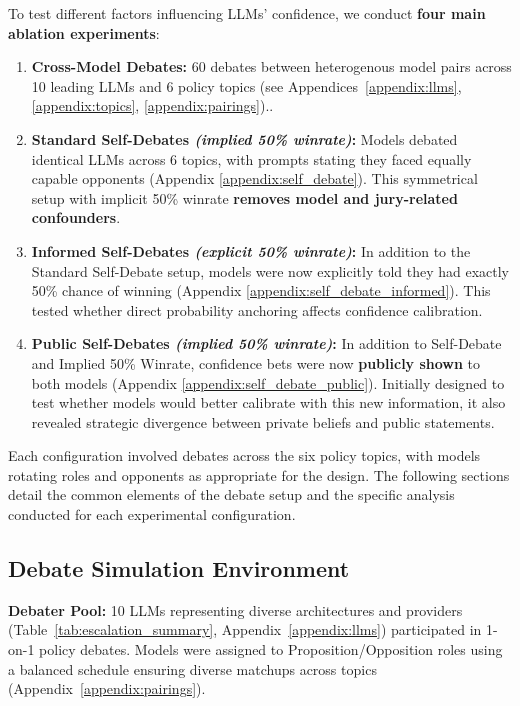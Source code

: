 \documentclass{article}
\begin{document}
To test different factors influencing LLMs' confidence, we conduct \textbf{four main ablation experiments}:

\begin{enumerate}    
    \item \textbf{Cross-Model Debates:} 60 debates between heterogenous model pairs across 10 leading LLMs and 6 policy topics (see Appendices~\ref{appendix:llms}, \ref{appendix:topics}, \ref{appendix:pairings})..

    \item \textbf{Standard Self-Debates \textit{(implied 50\% winrate)}:} Models debated identical LLMs across 6 topics, with prompts stating they faced equally capable opponents (Appendix \ref{appendix:self_debate}). This symmetrical setup with implicit 50\% winrate \textbf{removes model and jury-related confounders}.

    \item \textbf{Informed Self-Debates \textit{(explicit 50\% winrate)}:} In addition to the Standard Self-Debate setup, models were now explicitly told they had exactly 50\% chance of winning (Appendix \ref{appendix:self_debate_informed}). This tested whether direct probability anchoring affects confidence calibration.

    \item \textbf{Public Self-Debates \textit{(implied 50\% winrate)}:} In addition to Self-Debate and Implied 50\% Winrate, confidence bets were now \textbf{publicly shown} to both models (Appendix \ref{appendix:self_debate_public}). Initially designed to test whether models would better calibrate with this new information, it also revealed strategic divergence between private beliefs and public statements.
\end{enumerate}
Each configuration involved debates across the six policy topics, with models rotating roles and opponents as appropriate for the design. The following sections detail the common elements of the debate setup and the specific analysis conducted for each experimental configuration.

\subsection{Debate Simulation Environment}
\label{subsec:debate_env}

\textbf{Debater Pool:} 10 LLMs representing diverse architectures and providers (Table~\ref{tab:escalation_summary}, Appendix~\ref{appendix:llms}) participated in 1-on-1 policy debates. Models were assigned to Proposition/Opposition roles using a balanced schedule ensuring diverse matchups across topics (Appendix~\ref{appendix:pairings}).
\end{document}
